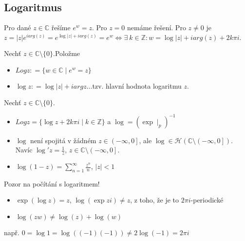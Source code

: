 
\subsection{Logaritmus}

Pro dané $z\in\mathbb{C}$ řešíme $e^w=z$. Pro $z=0$ nemáme řešení. Pro $z\neq 0$ je $z=\lvert z \rvert e^{i  arg(z)}=e^{\log\lvert z \rvert+i   arg(z)}=e^w\iff\exists\ k \in\mathbb{Z}\colon w=\log \lvert z \rvert +i arg(z)+2k\pi i$.

\begin{definition}
Nechť $z\in\mathbb{C}\setminus\{0\}$.Položme 
\begin{itemize}
    \item $Log z\colon=\{w\in\mathbb{C}\mid e^w=z\}$
    \item $\log z\colon= \log\lvert z \rvert + i arg z \dots$tzv. hlavní hodnota logaritmu $z$.
\end{itemize}
\end{definition}

\begin{properties}
Nechť $z \in\mathbb{C}\setminus\{0\}$.
\begin{itemize}
    \item $Log z =\{\log z +2k\pi i\mid k\in\mathbb{Z}\}$ a $
    \log =(\exp{}\mid _p)^{-1}$
    \item $\log{}$ není spojitá v žádném $z\in\left (-\infty,0\right ]$, ale $\log{}\in \mathcal{H}(\mathbb{C}\setminus\left (-\infty,0\right ])$.
    \newline Navíc $\log'z=\frac{1}{z}$, $z\in\mathbb{C}\setminus\left (-\infty,0\right ]$.
     \item $\log(1-z)=\sum_{n=1}^{\infty}\frac{z^n}{n}$, $\lvert z \rvert<1$
\end{itemize}

 Pozor na počítání s logaritmem!

 \begin{itemize}
     \item $\exp(\log z)=z$, $\log(\exp{z i})\neq z$, z toho, že je to $2\pi i$-periodické
     \item $\log(z w)\neq \log(z) + \log(w)$
 \end{itemize}
\end{properties}


např. $0=\log 1= \log((-1)(-1))\neq 2 \log(-1)=2\pi i$

